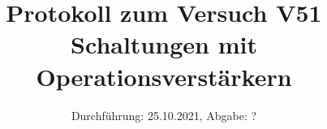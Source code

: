 \title{Protokoll zum Versuch V51 \\ Schaltungen mit Operationsverstärkern}
\date{Durchführung: 25.10.2021, Abgabe: ?}

